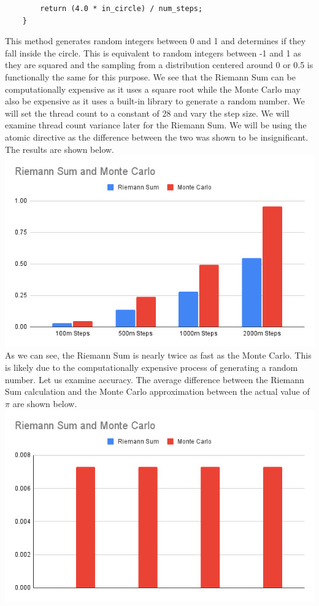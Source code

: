 \documentclass{article}
\begin{document}
\begin{multicols}{2}
\begin{lstlisting}
        return (4.0 * in_circle) / num_steps;
    }
\end{lstlisting}
This method generates random integers between 0 and 1 and determines if they fall inside the circle. This is equivalent to random integers between -1 and 1 as they are squared and the sampling from a distribution centered around 0 or 0.5 is functionally the same for this purpose.
We see that the Riemann Sum can be computationally expensive as it uses a square root while the Monte Carlo may also be expensive as it uses a built-in library to generate a random number. We will set the thread count to a constant of 28 and vary the step size. We will examine thread count variance later for the Riemann Sum. We will be using the atomic directive as the difference between the two was shown to be insignificant. The results are shown below.
\includegraphics[width=\linewidth]{Images/riemann_monte_performance.png}
As we can see, the Riemann Sum is nearly twice as fast as the Monte Carlo. This is likely due to the computationally expensive process of generating a random number. Let us examine accuracy. The average difference between the Riemann Sum calculation and the Monte Carlo approximation between the actual value of $\pi$ are shown below. 
\includegraphics[width=\linewidth]{Images/riemann_monte.png}

\end{multicols}
\end{document}
